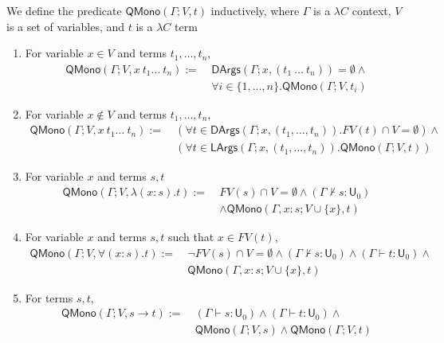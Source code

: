 \begin{definition} We define the predicate $\mathsf{QMono}(\Gamma; V, t)$ inductively,
  where $\Gamma$ is a $\lambda C$ context, $V$ is a set of variables, and $t$ is a $\lambda C$ term
  \begin{enumerate}
    \item For variable $x \in V$ and terms $t_1, \dots, t_n$,
      \begin{align*}
        \mathsf{QMono}(\Gamma; V, x \ t_1 \dots \ t_n) := \ &
        \mathsf{DArgs}(\Gamma; x, (t_1 \ \dots \ t_n)) = \emptyset \land \\
        & \forall i \in \{1, \dots, n\}. \mathsf{QMono}(\Gamma; V, t_i)
      \end{align*}
    \item For variable $x \notin V$ and terms $t_1, \dots, t_n$,
      \begin{align*}
        \mathsf{QMono}(\Gamma; V, x \ t_1 \dots \ t_n) := \ & (\forall t \in \mathsf{DArgs}(\Gamma; x, (t_1, \dots, t_n)). FV(t) \cap V = \emptyset) \land \\
        & (\forall t \in \mathsf{LArgs}(\Gamma; x, (t_1, \dots, t_n)). \mathsf{QMono}(\Gamma; V, t))
      \end{align*}
    \item For variable $x$ and terms $s, t$
      \begin{align*}
        \mathsf{QMono}(\Gamma; V, \lambda (x : s). t) := \
        & FV(s) \cap V = \emptyset \land (\Gamma \not\vdash s : \mathsf{U}_0) \\
        & \land \mathsf{QMono}(\Gamma, x : s; V \cup \{x\}, t)
      \end{align*}
    \item For variable $x$ and terms $s, t$ such that $x \in FV(t)$,
      \begin{align*}
        \mathsf{QMono}(\Gamma; V, \forall (x : s). t) := \
        & \neg FV(s) \cap V = \emptyset \land (\Gamma \not \vdash s : \mathsf{U}_0) \land  (\Gamma \vdash t : \mathsf{U}_0) \land \\
        & \mathsf{QMono}(\Gamma, x : s; V \cup \{x\}, t)
      \end{align*}
    \item For terms $s, t$,
      \begin{align*}
        \mathsf{QMono}(\Gamma; V, s \to t) := \ & (\Gamma \vdash s : \mathsf{U}_0) \land (\Gamma \vdash t : \mathsf{U}_0) \land \\
        & \mathsf{QMono}(\Gamma; V, s) \land \mathsf{QMono}(\Gamma; V, t)
      \end{align*}
  \end{enumerate}
\end{definition}

